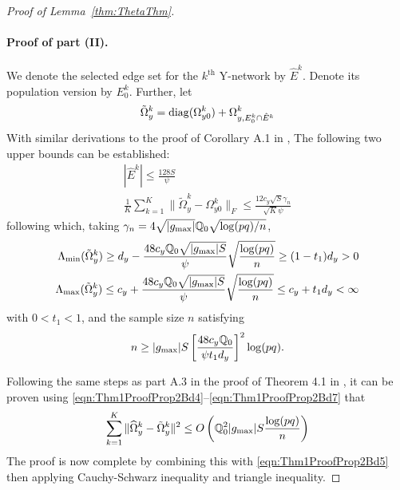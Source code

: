 \begin{proof}[Proof of Lemma~\ref{thm:ThetaThm}]
\paragraph{Proof of part (II).}
We denote the selected edge set for the $k^\text{th}$ Y-network by $\hat E^k$. Denote its population version by $E_0^k$. Further, let
%
$$
\tilde \Omega_y^k = \operatorname*{diag} (\Omega_{y0}^k) + \Omega_{y, E_0^k \cap \hat E^k}^k
$$
%
With similar derivations to the proof of Corollary A.1 in \cite{MaMichailidis15}, The following two upper bounds can be established:
%
\begin{align}
| \hat E^k | \leq \frac{ 128 S }{\psi} \label{eqn:Thm1ProofProp2Bd4}\\
\frac{1}{K} \sum_{k=1}^K \| \tilde \Omega_y^k - \Omega_{y0}^k \|_F \leq
\frac{12 c_y \sqrt{S} \gamma_n} {\sqrt K \psi} \label{eqn:Thm1ProofProp2Bd5}
\end{align}
%
following which, taking $\gamma_n = 4 \sqrt{| g_{\max}|} {\mathbb{Q}}_0 \sqrt{ \log (pq)/ n}$,
%
\begin{align}
\Lambda_{\min} ( \tilde \Omega_y^k) \geq d_y - \frac{48 c_y {\mathbb{Q}}_0 \sqrt{| g_{\max}| S}}{ \psi}
\sqrt{ \frac{ \log (pq)}{n}} \geq (1 - t_1) d_y > 0 \label{eqn:Thm1ProofProp2Bd6}\\
\Lambda_{\max} ( \tilde \Omega_y^k) \leq c_y + \frac{48 c_y {\mathbb{Q}}_0 \sqrt{| g_{\max}| S}}{ \psi}
\sqrt{ \frac{ \log (pq)}{n}} \leq c_y + t_1 d_y < \infty \label{eqn:Thm1ProofProp2Bd7}
\end{align}
%
with $0 < t_1 < 1$, and the sample size $n$ satisfying
%
$$
n \geq | g_{\max}| S \left[ \frac{48 c_y {\mathbb{Q}}_0}{\psi t_1 d_y} \right]^2 \log (pq).
$$

Following the same steps as part A.3 in the proof of Theorem 4.1 in \cite{MaMichailidis15}, it can be proven using \eqref{eqn:Thm1ProofProp2Bd4}--\eqref{eqn:Thm1ProofProp2Bd7} that
%
$$
\sum_{k=1}^K \| \widehat \Omega_y^k - \tilde \Omega_y^k \|^2 \leq O \left( {\mathbb{Q}}_0^2 | g_{\max}| S 
\frac{ \log (pq)}{n} \right)
$$
%
The proof is now complete by combining this with \eqref{eqn:Thm1ProofProp2Bd5} then applying Cauchy-Schwarz inequality and triangle inequality.
\end{proof}

